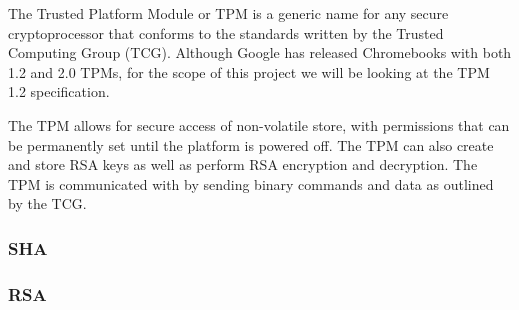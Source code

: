 \documentclass[../report.tex]{subfiles}
\begin{document}
The Trusted Platform Module or TPM is a generic name for any secure cryptoprocessor that conforms to the standards written by the Trusted Computing Group (TCG). %
Although Google has released Chromebooks with both 1.2 and 2.0 TPMs, for the scope of this project we will be looking at the TPM 1.2 specification.

The TPM allows for secure access of non-volatile store, with permissions that can be permanently set until the platform is powered off.
The TPM can also create and store RSA keys as well as perform RSA encryption and decryption. 
The TPM is communicated with by sending binary commands and data as outlined by the TCG. %



\subsubsection{SHA}
\subsubsection{RSA}
\end{document}
